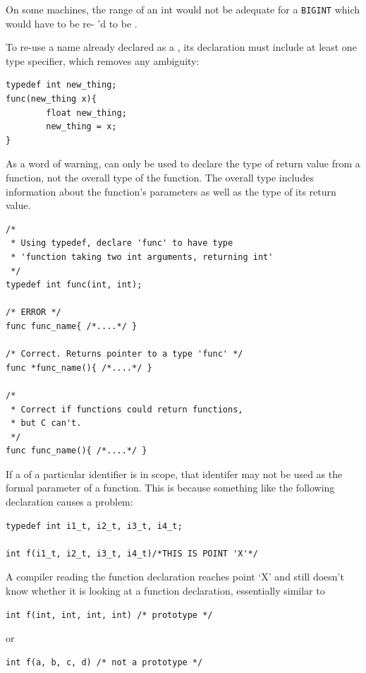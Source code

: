   On some machines, the range of an int would not be adequate for
   a \texttt{BIGINT} which would have to be re- \typedef{}'d
   to be \klong.


  To re-use a name already declared as a \typedef, its
   declaration must include at least one type specifier, which removes any
   ambiguity:


\begin{Verbatim}
typedef int new_thing;
func(new_thing x){
        float new_thing;
        new_thing = x;
}
\end{Verbatim}

  As a word of warning, \typedef{} can only be used to declare
   the type of return value from a function, not the overall type of the
   function. The overall type includes information about the function's
   parameters as well as the type of its return value.


\begin{Verbatim}
/*
 * Using typedef, declare 'func' to have type
 * 'function taking two int arguments, returning int'
 */
typedef int func(int, int);

/* ERROR */
func func_name{ /*....*/ }

/* Correct. Returns pointer to a type 'func' */
func *func_name(){ /*....*/ }

/*
 * Correct if functions could return functions,
 * but C can't.
 */
func func_name(){ /*....*/ }
\end{Verbatim}

  If a \typedef{} of a particular identifier is in scope, that
   identifer may not be used as the formal parameter of a function. This is
   because something like the following declaration causes a problem:


\begin{Verbatim}
typedef int i1_t, i2_t, i3_t, i4_t;

int f(i1_t, i2_t, i3_t, i4_t)/*THIS IS POINT 'X'*/
\end{Verbatim}

  A compiler reading the function declaration reaches point `X' and
   still doesn't know whether it is looking at a function declaration,
   essentially similar to


\begin{Verbatim}
int f(int, int, int, int) /* prototype */
\end{Verbatim}

  or


\begin{Verbatim}
int f(a, b, c, d) /* not a prototype */
\end{Verbatim}

